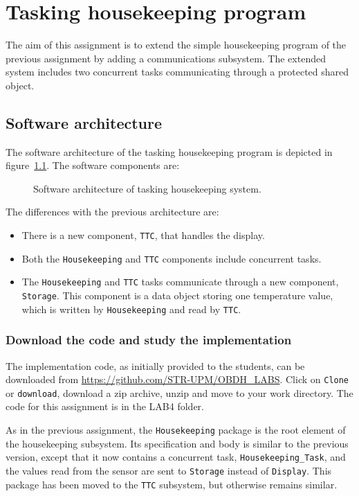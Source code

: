 \chapter{Tasking housekeeping program}\label{ch:Assignment4}

The aim of this assignment is to extend the simple housekeeping program of the previous assignment by adding a communications subsystem. The extended system includes two concurrent tasks communicating through a protected shared object.

\section{Software architecture}

The software architecture of the tasking housekeeping program is depicted in figure~\ref{fig:tasking}. The software components are:

\begin{figure}[h]
            \caption{Software architecture of tasking housekeeping system.}
            \label{fig:tasking}
\end{figure}

The differences with the previous architecture are:
\begin{itemize}
\item There is a new component, {\tt TTC}, that handles the display.
\item Both the {\tt Housekeeping} and {\tt TTC} components include concurrent tasks.
\item The {\tt Housekeeping} and {\tt TTC} tasks communicate through a new component, {\tt Storage}. This component is a data object storing one temperature value, which is written by {\tt Housekeeping} and read by {\tt TTC}.
\end{itemize}

\subsection{Download the code and study the implementation}

The implementation code, as initially provided to the students, can be downloaded from \url{https://github.com/STR-UPM/OBDH\_LABS}. Click on {\tt Clone} or {\tt download}, download a zip archive, unzip and move to your work directory. The code for this assignment is in the LAB4 folder.

As in the previous assignment, the {\tt Housekeeping} package is the root element of the housekeeping subsystem. Its specification and body is similar to the previous version, except that it now contains a concurrent task, {\tt Housekeeping\_Task}, and the values read from the sensor are sent to {\tt Storage} instead of {\tt Display}. This package has been moved to the {\tt TTC} subsystem, but otherwise remains similar.

